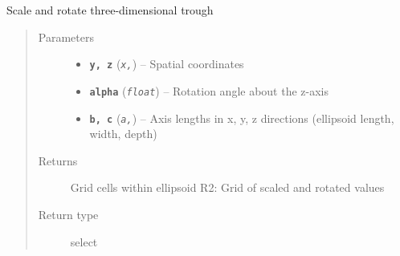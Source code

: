 \documentclass[letterpaper,10pt,english]{sphinxmanual}
\begin{document}
\begin{fulllineitems}
\label{hyvr:hyvr.hyvr.sim.scale_rotate}
Scale and rotate three-dimensional trough
\begin{quote}\begin{description}
\item[{Parameters}] \leavevmode\begin{itemize}
\item {} 
\textbf{\texttt{y, z}} (\emph{\texttt{x,}}) -- Spatial coordinates

\item {} 
\textbf{\texttt{alpha}} (\emph{\texttt{float}}) -- Rotation angle about the z-axis

\item {} 
\textbf{\texttt{b, c}} (\emph{\texttt{a,}}) -- Axis lengths in x, y, z directions (ellipsoid length, width, depth)

\end{itemize}

\item[{Returns}] \leavevmode
Grid cells within ellipsoid
R2:                             Grid of scaled and rotated values

\item[{Return type}] \leavevmode
select

\end{description}\end{quote}

\end{fulllineitems}

\end{document}
